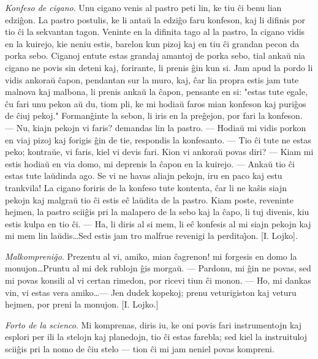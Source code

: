 \emph{Konfeso de cigano}. Unu cigano venis al pastro peti lin, ke
tiu \^ci benu lian edzi\^gon. La pastro postulis, ke li anta\u u la
edzi\^go faru konfeson, kaj li difinis por tio \^ci la sekvantan
tagon. Veninte en la difinita tago al la pastro, la cigano vidis en
la kuirejo, kie neniu estis, barelon kun pizoj kaj en tiu \^ci
grandan pecon da porka sebo. Ciganoj entute estas grandaj amantoj de
porka sebo, tial anka\u u nia cigano ne povis sin deteni kaj,
forirante, li prenis \^gin kun si. Jam apud la pordo li vidis
ankora\u u \^capon, pendantan sur la muro, kaj, \^car lia propra
estis jam tute malnova kaj malbona, li prenis anka\u u la \^capon,
pensante en si: "estas tute egale, \^cu fari unu pekon a\u u du,
tiom pli, ke mi hodia\u u faros mian konfeson kaj puri\^gos de
\^ciuj pekoj." Forman\^ginte la sebon, li iris en la pre\^gejon,
por fari la konfeson. --- Nu, kiajn pekojn vi faris? demandas lin la
pastro. --- Hodia\u u mi vidis porkon en viaj pizoj kaj forigis
\^gin de tie, respondis la konfesanto. --- Tio \^ci tute ne estas
peko; kontra\u ue, vi faris, kiel vi devis fari. Kion vi ankora\u u
povas diri? --- Kiam mi estis hodia\u u en via domo, mi deprenis la
\^capon en la kuirejo. --- Anka\u u tio \^ci estas tute la\u udinda
ago. Se vi ne havas aliajn pekojn, iru en paco kaj estu trankvila!
La cigano foriris de la konfeso tute kontenta, \^car li ne ka\^sis
siajn pekojn kaj malgra\u u tio \^ci estis e\^c la\u udita de la
pastro. Kiam poste, reveninte hejmen, la pastro scii\^gis pri la
malapero de la sebo kaj la \^capo, li tuj divenis, kiu estis kulpa
en tio \^ci. --- Ha, li diris al si mem, li e\^c konfesis al mi
siajn pekojn kaj mi mem lin la\u udis\dots Sed estis jam tro malfrue
revenigi la perdita\^{\j}on. [I. Lojko].

\emph{Malkompreni\^go}. Prezentu al vi, amiko, mian \^cagrenon! mi
forgesis en domo la monujon\dots Pruntu al mi dek rublojn \^gis
morga\u u. --- Pardonu, mi \^gin ne povas, sed mi povas konsili al
vi certan rimedon, por ricevi tiun \^ci monon. --- Ho, mi dankas
vin, vi estas vera amiko\dots --- Jen dudek kopekoj; prenu
veturigiston kaj veturu hejmen, por preni la monujon. [I. Lojko.]

\emph{Forto de la scienco}. Mi komprenas, diris iu, ke oni povis
fari instrumentojn kaj esplori per ili la stelojn kaj planedojn, tio
\^ci estas farebla; sed kiel la instruituloj scii\^gis pri la nomo
de \^ciu stelo --- tion \^ci mi jam neniel povas kompreni.

